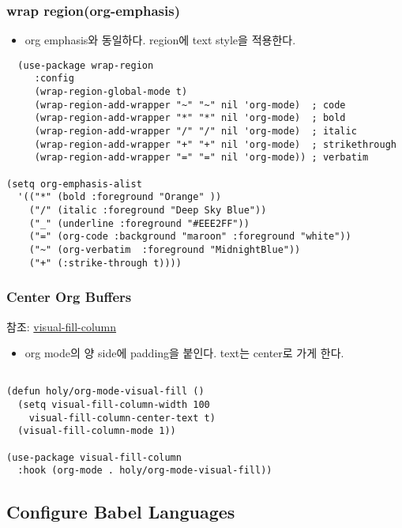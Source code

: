 \documentclass[11pt]{article}
\begin{document}
\subsubsection*{wrap region(org-emphasis)}
\label{sec:org253d549}
\begin{itemize}
\item org emphasis와 동일하다. region에 text style을 적용한다.
\end{itemize}
\begin{verbatim}
  (use-package wrap-region
     :config
     (wrap-region-global-mode t)
     (wrap-region-add-wrapper "~" "~" nil 'org-mode)  ; code
     (wrap-region-add-wrapper "*" "*" nil 'org-mode)  ; bold
     (wrap-region-add-wrapper "/" "/" nil 'org-mode)  ; italic
     (wrap-region-add-wrapper "+" "+" nil 'org-mode)  ; strikethrough
     (wrap-region-add-wrapper "=" "=" nil 'org-mode)) ; verbatim

(setq org-emphasis-alist
  '(("*" (bold :foreground "Orange" ))
    ("/" (italic :foreground "Deep Sky Blue"))
    ("_" (underline :foreground "#EEE2FF"))
    ("=" (org-code :background "maroon" :foreground "white"))
    ("~" (org-verbatim  :foreground "MidnightBlue"))
    ("+" (:strike-through t))))

\end{verbatim}
\subsubsection*{Center Org Buffers}
\label{sec:orgac1d469}
참조:  \href{https://github.com/joostkremers/visual-fill-column}{visual-fill-column} 
\begin{itemize}
\item org mode의 양 side에 padding을 붙인다. text는 center로 가게 한다.
\end{itemize}

\begin{verbatim}

(defun holy/org-mode-visual-fill ()
  (setq visual-fill-column-width 100
	visual-fill-column-center-text t)
  (visual-fill-column-mode 1))

(use-package visual-fill-column
  :hook (org-mode . holy/org-mode-visual-fill))

\end{verbatim}

\subsection*{Configure Babel Languages}
\label{sec:org804b3e9}
\end{document}
